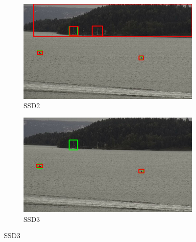 \begin{figure}
\begin{subfigure}{.5\textwidth}
  \centering
  \includegraphics[width=0.9\linewidth]{results/case_buildings/bigbox_bcbf/SSD2/selected_08_09_frame4530.jpg}
  \caption{SSD2}
  \label{fig:sfig1}
\end{subfigure}%
\begin{subfigure}{.5\textwidth}
  \centering
  \includegraphics[width=.9\linewidth]{results/case_buildings/bigbox_bcbf/SSD3/selected_08_09_frame4530.jpg}
  \caption{SSD3}
  \label{fig:sfig2}
\end{subfigure}


\end{figure}
